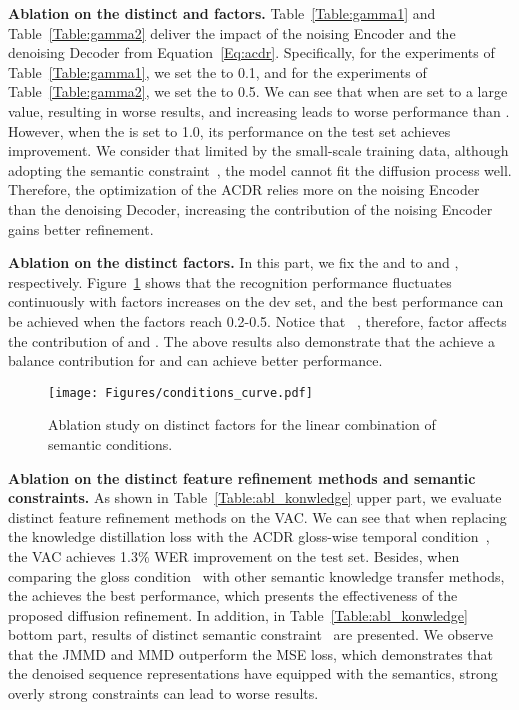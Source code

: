 \documentclass[sigconf]{acmart}
\begin{document}
\noindent \textbf{Ablation on the distinct  and  factors.}
Table~\ref{Table:gamma1} and Table~\ref{Table:gamma2} deliver the impact of the noising Encoder and the denoising Decoder from Equation~\ref{Eq:acdr}.
Specifically, for the experiments of Table~\ref{Table:gamma1}, we set the  to 0.1, and  for the experiments of Table~\ref{Table:gamma2}, we set the  to 0.5.
We can see that when  are set to a large value, resulting in worse results, and increasing  leads to worse performance than .
However, when the  is set to 1.0, its performance on the test set achieves improvement.
We consider that limited by the small-scale training data, although adopting the semantic constraint~, the model cannot fit the diffusion process well.
Therefore, the optimization of the ACDR relies more on the noising Encoder than the denoising Decoder, increasing the contribution of the noising Encoder gains better refinement.

\noindent \textbf{Ablation on the distinct  factors.}
In this part, we fix the  and  to  and , respectively.
Figure~\ref{Fig:tau} shows that the recognition performance fluctuates continuously with  factors increases on the dev set, and the best performance can be achieved when the  factors reach 0.2-0.5.
Notice that ~, therefore,  factor affects the
contribution of  and .
The above results also demonstrate that the achieve a balance contribution for  and  can achieve better performance.


\begin{figure}[h]
  \centering
  \texttt{[image: Figures/conditions\_curve.pdf]}
  \caption{Ablation study on distinct  factors for the linear combination of semantic conditions.}
 \label{Fig:tau}
\end{figure}

\noindent \textbf{Ablation on the distinct feature refinement methods and semantic constraints.}
As shown in Table~\ref{Table:abl_konwledge} upper part, we evaluate distinct feature refinement methods on the VAC.
We can see that when replacing the knowledge distillation loss with the ACDR gloss-wise temporal condition~, the VAC achieves 1.3\% WER improvement on the test set.
Besides, when comparing the gloss condition~ with other semantic knowledge transfer methods, the  achieves the best performance, which presents the effectiveness of the proposed diffusion refinement.
In addition, in Table~\ref{Table:abl_konwledge} bottom part, results of distinct semantic constraint~ are presented. 
We observe that the JMMD and MMD outperform the MSE loss, which demonstrates that the denoised sequence representations have equipped with the semantics, strong overly strong constraints can lead to worse results.
\end{document}
